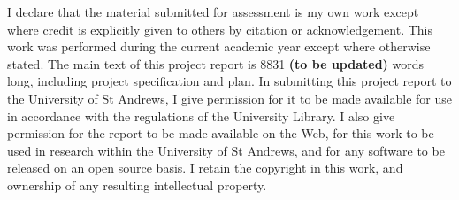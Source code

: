 I declare that the material submitted for assessment is my own work except where credit is explicitly given to others by citation or acknowledgement. This work was performed during the current academic year except where otherwise stated. The main text of this project report is 8831 \textbf{(to be updated)} words long, including project specification and plan. In submitting this project report to the University of St Andrews, I give permission for it to be made available for use in accordance with the regulations of the University Library. I also give permission for the report to be made available on the Web, for this work to be used in research within the University of St Andrews, and for any software to be released on an open source basis. I retain the copyright in this work, and ownership of any resulting intellectual property.
